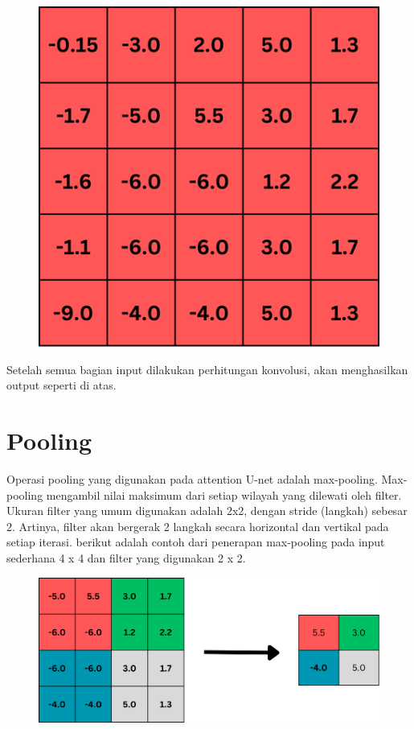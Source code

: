 \begin{figure}[H]
	\centering
	\includegraphics[scale=.4]{gambar/lampiran/hasil-konvolusi.png}
\end{figure}

\noindent Setelah semua bagian input dilakukan perhitungan konvolusi, akan menghasilkan output seperti di atas.

\section{Pooling}


\noindent Operasi pooling yang digunakan pada attention U-net adalah max-pooling. Max-pooling mengambil nilai maksimum dari setiap wilayah yang dilewati oleh filter.  Ukuran filter yang umum digunakan adalah 2x2, dengan stride (langkah) sebesar 2.  Artinya, filter akan bergerak 2 langkah secara horizontal dan vertikal pada setiap iterasi. berikut adalah contoh dari penerapan max-pooling pada input sederhana 4 x 4 dan filter yang digunakan 2 x 2.

\begin{figure}[H]
	\centering
	\includegraphics[scale=.4]{gambar/lampiran/pooling.png}
\end{figure}

